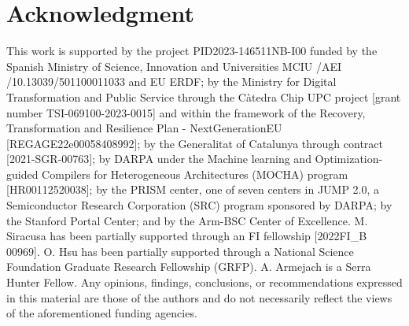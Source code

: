 \chapter*{Acknowledgment}
This work is supported by the project PID2023-146511NB-I00 funded by the Spanish Ministry of Science, Innovation and Universities MCIU /AEI /10.13039/501100011033 and EU ERDF; by the Ministry for Digital Transformation and Public Service through the Càtedra Chip UPC project [grant number TSI-069100-2023-0015] and within the framework of the Recovery, Transformation and Resilience Plan - NextGenerationEU [REGAGE22e00058408992]; by the Generalitat of Catalunya through contract [2021-SGR-00763]; by DARPA under the Machine learning and Optimization-guided Compilers for Heterogeneous Architectures (MOCHA) program [HR00112520038]; 
by the PRISM center, one of seven centers in JUMP 2.0, a Semiconductor Research Corporation (SRC) program sponsored by DARPA; by the Stanford Portal Center; and by the Arm-BSC Center of Excellence. M. Siracusa has been partially supported through an FI fellowship [2022FI\_B 00969]. O. Hsu has been partially supported through a National Science Foundation Graduate Research Fellowship (GRFP). A. Armejach is a Serra Hunter Fellow. Any opinions, findings, conclusions, or recommendations expressed in this material are those of the authors and do not necessarily reflect the views of the aforementioned funding agencies.
